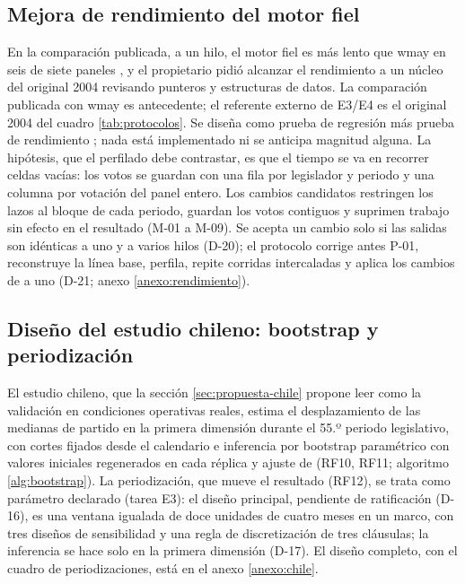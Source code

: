 \subsection{Mejora de rendimiento del motor fiel}
\label{sec:rendimiento}

En la comparación publicada, a un hilo, el motor fiel es más lento que wmay en seis de siete
paneles \parencite{nieves2026jcc}, y el propietario pidió alcanzar el rendimiento a un núcleo
del original 2004 revisando punteros y estructuras de datos. La comparación publicada con
wmay es antecedente; el referente externo de E3/E4 es el original 2004 del cuadro
\ref{tab:protocolos}. Se diseña como prueba de regresión más
prueba de rendimiento \parencite[cap.~5, §2.2.5 y §2.2.7]{swebok2025}; nada está implementado
ni se anticipa magnitud alguna. La hipótesis, que el perfilado debe contrastar, es que el
tiempo se va en recorrer celdas vacías: los votos se guardan con una fila por legislador y
periodo y una columna por votación del panel entero. Los cambios candidatos restringen los
lazos al bloque de cada periodo, guardan los votos contiguos y suprimen trabajo sin efecto en
el resultado (M-01 a M-09). Se acepta un cambio solo si las salidas son idénticas a uno y a
varios hilos (D-20); el protocolo corrige antes P-01, reconstruye la línea base, perfila,
repite corridas intercaladas y aplica los cambios de a uno (D-21; anexo
\ref{anexo:rendimiento}).

\subsection{Diseño del estudio chileno: bootstrap y periodización}
\label{sec:algoritmos}

El estudio chileno, que la sección \ref{sec:propuesta-chile} propone leer como la validación
en condiciones operativas reales, estima el desplazamiento de las medianas de partido en la
primera dimensión durante el 55.º periodo legislativo, con cortes fijados desde el calendario e
inferencia por bootstrap paramétrico \parencite{lewis2004measuring,carroll2009measuring} con
valores iniciales regenerados en cada réplica y ajuste de \textcite{holm1979simple} (RF10,
RF11; algoritmo \ref{alg:bootstrap}). La periodización, que mueve el resultado (RF12), se trata
como parámetro declarado (tarea E3): el diseño principal, pendiente de ratificación (D-16), es
una ventana igualada de doce unidades de cuatro meses en un marco, con tres diseños de
sensibilidad y una regla de discretización de tres cláusulas; la inferencia se hace solo en la
primera dimensión (D-17). El diseño completo, con el cuadro de periodizaciones, está en el
anexo \ref{anexo:chile}.

